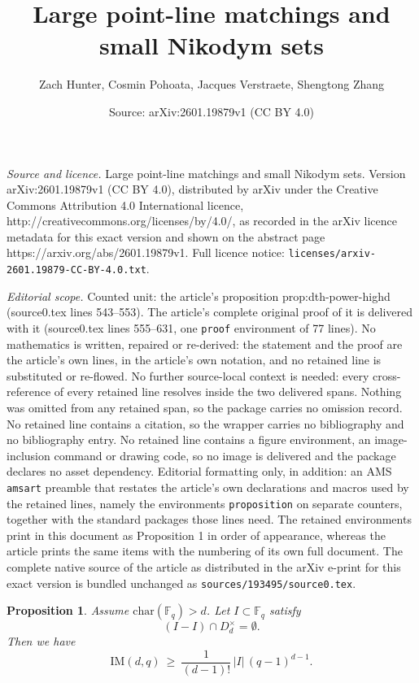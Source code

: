 \documentclass[10pt,a4paper]{amsart}
\title{Large point-line matchings and small Nikodym sets}
\author{Zach Hunter, Cosmin Pohoata, Jacques Verstraete, Shengtong Zhang}
\date{Source: arXiv:2601.19879v1 (CC BY 4.0)}
\newtheorem{proposition}{Proposition}
\newcommand{\F}{\mathbb{F}}
\newcommand{\IM}{\mathrm{IM}}
\begin{document}
\maketitle

\noindent\emph{Source and licence.} Large point-line matchings and small Nikodym sets. Version arXiv:2601.19879v1 (CC BY 4.0), distributed by arXiv under the Creative Commons Attribution 4.0 International licence, http://creativecommons.org/licenses/by/4.0/, as recorded in the arXiv licence metadata for this exact version and shown on the abstract page https://arxiv.org/abs/2601.19879v1. Full licence notice: \texttt{licenses/arxiv-2601.19879-CC-BY-4.0.txt}.\par\smallskip

\noindent\textit{Editorial scope.} Counted unit: the article's proposition prop:dth-power-highd (source0.tex lines 543--553). The article's complete original proof of it is delivered with it (source0.tex lines 555--631, one \texttt{proof} environment of 77 lines). No mathematics is written, repaired or re-derived: the statement and the proof are the article's own lines, in the article's own notation, and no retained line is substituted or re-flowed.  No further source-local context is needed: every cross-reference of every retained line resolves inside the two delivered spans.  Nothing was omitted from any retained span, so the package carries no omission record.  No retained line contains a citation, so the wrapper carries no bibliography and no bibliography entry.  No retained line contains a figure environment, an image-inclusion command or drawing code, so no image is delivered and the package declares no asset dependency.  Editorial formatting only, in addition: an AMS \texttt{amsart} preamble that restates the article's own declarations and macros used by the retained lines, namely the environments \texttt{proposition} on separate counters, together with the standard packages those lines need.  The retained environments print in this document as Proposition 1 in order of appearance, whereas the article prints the same items with the numbering of its own full document.  The complete native source of the article as distributed in the arXiv e-print for this exact version is bundled unchanged as \texttt{sources/193495/source0.tex}.
\begin{proposition}\label{prop:dth-power-highd}
Assume $\mathrm{char}(\F_q)>d$.
Let $I\subset \F_q$ satisfy
\[
  (I-I)\cap D_d^\times=\emptyset.
\]
Then we have
\[
  \IM(d,q)\ \ge\ \frac{1}{(d-1)!}\,|I|\,(q-1)^{d-1}.
\]
\end{proposition}
\end{document}
